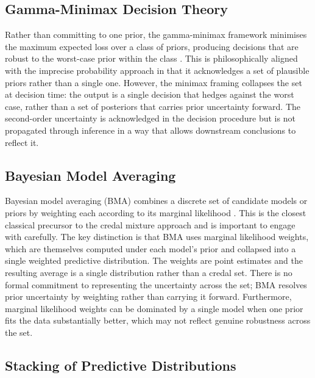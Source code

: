 \subsection{Gamma-Minimax Decision Theory}

Rather than committing to one prior, the gamma-minimax framework minimises 
the maximum expected loss over a class of priors, producing decisions that 
are robust to the worst-case prior within the class \citep{berger1985}. This 
is philosophically aligned with the imprecise probability approach in that 
it acknowledges a set of plausible priors rather than a single one. 
However, the minimax framing collapses the set at decision time: the 
output is a single decision that hedges against the worst case, rather 
than a set of posteriors that carries prior uncertainty forward. The 
second-order uncertainty is acknowledged in the decision procedure but 
is not propagated through inference in a way that allows downstream 
conclusions to reflect it.

\subsection{Bayesian Model Averaging}

Bayesian model averaging (BMA) combines a discrete set of candidate 
models or priors by weighting each according to its marginal likelihood 
\citep{hoeting1999}. This is the closest classical precursor to the 
credal mixture approach and is important to engage with carefully. The 
key distinction is that BMA uses marginal likelihood weights, which are 
themselves computed under each model's prior and collapsed into a single 
weighted predictive distribution. The weights are point estimates and the 
resulting average is a single distribution rather than a credal set. There 
is no formal commitment to representing the uncertainty across the set; 
BMA resolves prior uncertainty by weighting rather than carrying it forward. 
Furthermore, marginal likelihood weights can be dominated by a single model 
when one prior fits the data substantially better, which may not reflect 
genuine robustness across the set.

\subsection{Stacking of Predictive Distributions}

